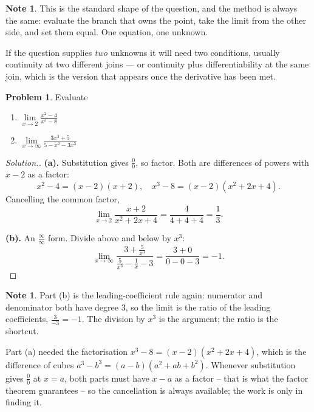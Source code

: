 \documentclass[11pt,a4paper]{article}
\theoremstyle{definition}
\newtheorem{note}[thm]{Note}
\newtheorem{problemx}{Problem}[section]
\newenvironment{problem}{\begin{problemx}}{\end{problemx}}
\newenvironment{solution}
  {\renewcommand{\qedsymbol}{}\begin{proof}[\textit{Solution}.]}
  {\end{proof}}
\begin{document}
\begin{note}
This is the standard shape of the question, and the method is always the same:
evaluate the branch that owns the point, take the limit from the other side, and
set them equal. One equation, one unknown.

If the question supplies \emph{two} unknowns it will need two conditions, usually
continuity at two different joins --- or continuity plus differentiability at the
same join, which is the version that appears once the derivative has been met.
\end{note}

\pagebreak

\begin{problem}
Evaluate
\begin{enumerate}
\item[(a).] $\lim\limits_{x\to 2}\frac{x^{2}-4}{x^{3}-8}$
\item[(b).] $\lim\limits_{x\to\infty}\frac{3x^{3}+5}{5-x^{2}-3x^{3}}$
\end{enumerate}
\end{problem}

\begin{solution}
\textbf{(a).} Substitution gives $\frac{0}{0}$, so factor. Both are differences of
powers with $x-2$ as a factor:
$$x^{2}-4=(x-2)(x+2),\quad x^{3}-8=(x-2)\left(x^{2}+2x+4\right).$$
Cancelling the common factor,
$$\lim_{x\to 2}\frac{x+2}{x^{2}+2x+4}=\frac{4}{4+4+4}=\frac{1}{3}.$$

\textbf{(b).} An $\frac{\infty}{\infty}$ form. Divide above and below by $x^{3}$:
$$\lim_{x\to\infty}\frac{3+\frac{5}{x^{3}}}{\frac{5}{x^{3}}-\frac{1}{x}-3}
=\frac{3+0}{0-0-3}=-1 .$$
\end{solution}

\begin{note}
Part (b) is the leading-coefficient rule again: numerator and denominator both have
degree $3$, so the limit is the ratio of the leading coefficients, $\frac{3}{-3}=-1$.
The division by $x^{3}$ is the argument; the ratio is the shortcut.

Part (a) needed the factorisation $x^{3}-8=(x-2)\left(x^{2}+2x+4\right)$, which is
the difference of cubes $a^{3}-b^{3}=(a-b)\left(a^{2}+ab+b^{2}\right)$. Whenever
substitution gives $\frac{0}{0}$ at $x=a$, both parts must have $x-a$ as a factor --
that is what the factor theorem guarantees -- so the cancellation is always
available; the work is only in finding it.
\end{note}
\end{document}

